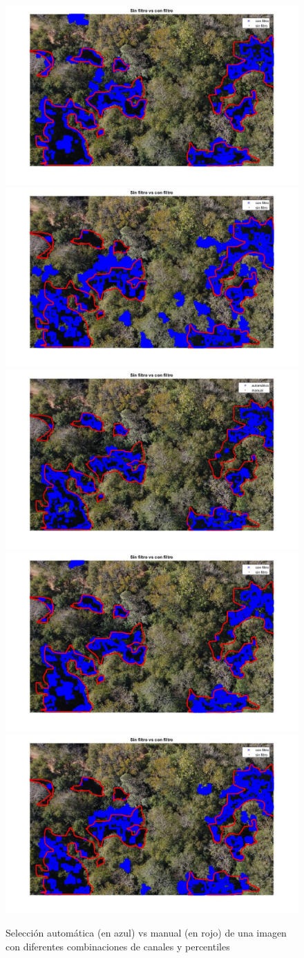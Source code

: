 \begin{figure}
    \includegraphics[width=.3\textwidth]{Imagenes/IIC/p85/BG/300a.jpg}\hfill
    \includegraphics[width=.3\textwidth]{Imagenes/IIC/p85/GR/300a.jpg}\hfill
    \\[\smallskipamount]
    \includegraphics[width=.3\textwidth]{Imagenes/IIC/p90/BR/300a.jpg}\hfill
    \includegraphics[width=.3\textwidth]{Imagenes/IIC/p90/BG/300a.jpg}\hfill
    \includegraphics[width=.3\textwidth]{Imagenes/IIC/p90/GR/300a.jpg}\hfill
    
    \caption{Selección automática (en azul) vs manual (en rojo) de una imagen con diferentes combinaciones de canales y percentiles}
\end{figure}\label{dji300}

